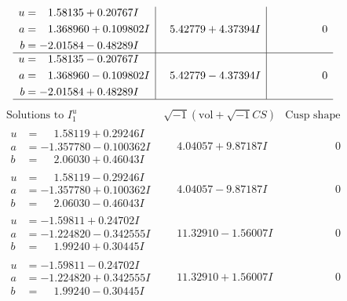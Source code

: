 \documentclass[1p]{elsarticle_modified}
\theoremstyle{definition}
\newcommand{\I}{\sqrt{-1}}
\begin{document}
$$\begin{array}{c|c|c}
\begin{aligned}
u &= \phantom{-}1.58135 + 0.20767 I \\
a &= \phantom{-}1.368960 + 0.109802 I \\
b &= -2.01584 - 0.48289 I\end{aligned}
 & \phantom{-}5.42779 + 4.37394 I & \phantom{-0.000000 } 0 \\ \hline\begin{aligned}
u &= \phantom{-}1.58135 - 0.20767 I \\
a &= \phantom{-}1.368960 - 0.109802 I \\
b &= -2.01584 + 0.48289 I\end{aligned}
 & \phantom{-}5.42779 - 4.37394 I & \phantom{-0.000000 } 0\\
 \hline 
 \end{array}$$\newpage$$\begin{array}{c|c|c}  
\text{Solutions to }I^u_{1}& \I (\text{vol} + \sqrt{-1}CS) & \text{Cusp shape}\\
 \hline 
\begin{aligned}
u &= \phantom{-}1.58119 + 0.29246 I \\
a &= -1.357780 - 0.100362 I \\
b &= \phantom{-}2.06030 + 0.46043 I\end{aligned}
 & \phantom{-}4.04057 + 9.87187 I & \phantom{-0.000000 } 0 \\ \hline\begin{aligned}
u &= \phantom{-}1.58119 - 0.29246 I \\
a &= -1.357780 + 0.100362 I \\
b &= \phantom{-}2.06030 - 0.46043 I\end{aligned}
 & \phantom{-}4.04057 - 9.87187 I & \phantom{-0.000000 } 0 \\ \hline\begin{aligned}
u &= -1.59811 + 0.24702 I \\
a &= -1.224820 - 0.342555 I \\
b &= \phantom{-}1.99240 + 0.30445 I\end{aligned}
 & \phantom{-}11.32910 - 1.56007 I & \phantom{-0.000000 } 0 \\ \hline\begin{aligned}
u &= -1.59811 - 0.24702 I \\
a &= -1.224820 + 0.342555 I \\
b &= \phantom{-}1.99240 - 0.30445 I\end{aligned}
 & \phantom{-}11.32910 + 1.56007 I & \phantom{-0.000000 } 0 \\ \hline\begin{aligned}

\end{aligned}
\end{array}$$
\end{document}
